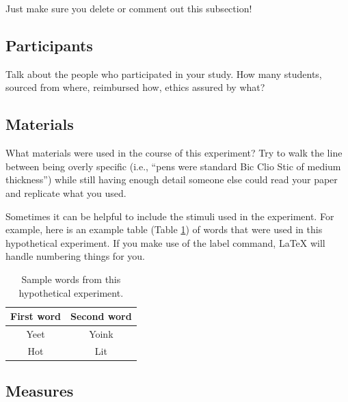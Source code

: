 \documentclass[stu,12pt,floatsintext]{apa7}
\begin{document}
Just make sure you delete or comment out this subsection!

\subsection{Participants}

Talk about the people who participated in your study. How many students, sourced from where, reimbursed how, ethics assured by what?

\subsection{Materials}

What materials were used in the course of this experiment? Try to walk the line between being overly specific (i.e., ``pens were standard Bic Clio Stic of medium thickness'') while still having enough detail someone else could read your paper and replicate what you used.

Sometimes it can be helpful to include the stimuli used in the experiment. For example, here is an example table (Table \ref{tab:table_words}) of words that were used in this hypothetical experiment. If you make use of the label command, \LaTeX{} will handle numbering things for you.

\begin{table}
    \caption{Sample words from this hypothetical experiment.}
    \centering
    \begin{tabular}{cc} %
        \hline 
         First word & Second word \\
         \hline
         Yeet & Yoink \\
         Hot & Lit \\
         \hline
    \end{tabular}
    \label{tab:table_words}
\end{table}




\subsection{Measures}
\end{document}
